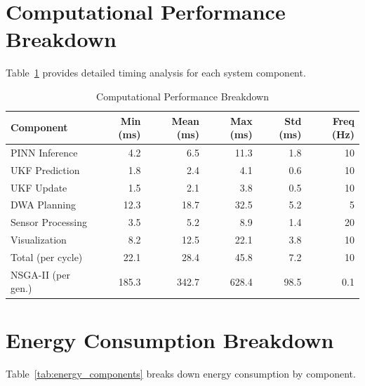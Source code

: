\section{Computational Performance Breakdown}
\label{sec:computation_breakdown}

Table~\ref{tab:computation_breakdown} provides detailed timing analysis for each system component.

\begin{table}[htbp]
\centering
\caption{Computational Performance Breakdown}
\label{tab:computation_breakdown}
\begin{tabular}{@{}lrrrrr@{}}
\toprule
\textbf{Component} & \textbf{Min (ms)} & \textbf{Mean (ms)} & \textbf{Max (ms)} & \textbf{Std (ms)} & \textbf{Freq (Hz)} \\
\midrule
PINN Inference & 4.2 & 6.5 & 11.3 & 1.8 & 10 \\
UKF Prediction & 1.8 & 2.4 & 4.1 & 0.6 & 10 \\
UKF Update & 1.5 & 2.1 & 3.8 & 0.5 & 10 \\
DWA Planning & 12.3 & 18.7 & 32.5 & 5.2 & 5 \\
Sensor Processing & 3.5 & 5.2 & 8.9 & 1.4 & 20 \\
Visualization & 8.2 & 12.5 & 22.1 & 3.8 & 10 \\
\midrule
Total (per cycle) & 22.1 & 28.4 & 45.8 & 7.2 & 10 \\
\midrule
NSGA-II (per gen.) & 185.3 & 342.7 & 628.4 & 98.5 & 0.1 \\
\bottomrule
\end{tabular}
\end{table}

\clearpage

\section{Energy Consumption Breakdown}
\label{sec:energy_breakdown}

Table~\ref{tab:energy_components} breaks down energy consumption by component.

